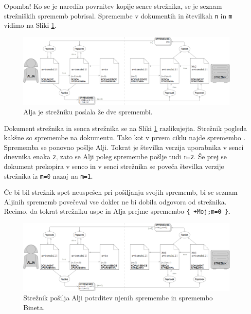 \documentclass[a4paper, 12pt, twoside]{book}
\begin{document}
\pagebreak

Opomba! Ko se je naredila povrnitev kopije sence strežnika, se je seznam strežniških sprememb pobrisal. Spremembe v dokumentih in številkah {\tt n} in {\tt m} vidimo na Sliki \ref{ds8}.

\begin{figure}[placement h]
\begin{center}
\includegraphics[width=16cm]{ds8.png}
\end{center}
\caption{Alja je strežniku poslala že dve spremembi.}
\label{ds8}
\end{figure}

Dokument strežnika in senca strežnika se na Sliki \ref{ds8} razlikujejta. Strežnik pogleda kakšne so spremembe na dokumentu. Tako kot v prvem ciklu najde spremembo . Sprememba se ponovno pošlje Alji. Tokrat je številka verzija uporabnika v senci dnevnika enaka {\tt 2}, zato se Alji poleg spremembe pošlje tudi {\tt n=2}. Še prej se dokument prekopira v senco in v senci strežnika se poveča številka verzije strežnika iz {\tt m=0} nazaj na {\tt m=1}.

Če bi bil strežnik spet neuspešen pri pošiljanju svojih sprememb, bi se seznam Aljinih sprememb povečeval vse dokler ne bi dobila odgovora od strežnika. Recimo, da tokrat strežniku uspe in Alja prejme spremembo {\tt \{ +Moj;m=0 \}}.

\begin{figure}[placement h]
\begin{center}
\includegraphics[width=16cm]{ds9.png}
\end{center}
\caption{Strežnik pošilja Alji potrditev njenih spremembe in spremembo Bineta.}
\label{ds9}
\end{figure}
\end{document}
